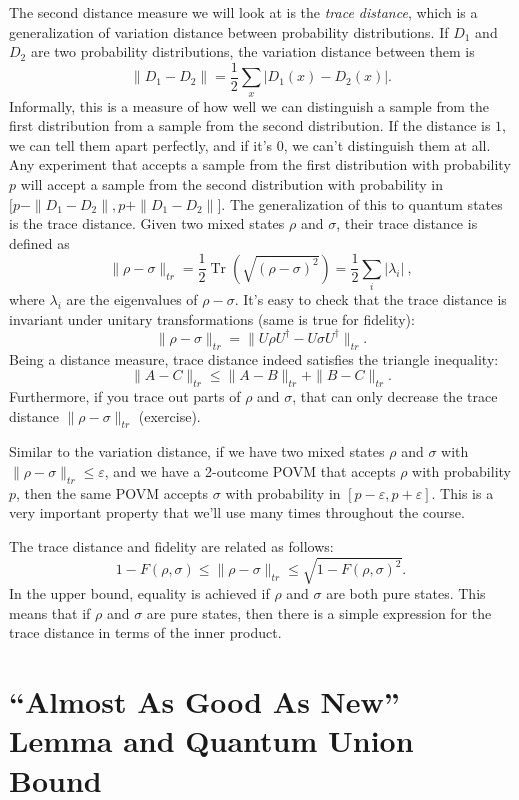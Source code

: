 \documentclass[12pt]{report}
\theoremstyle{plain}
\theoremstyle{definition}
\newcommand{\eps}{\varepsilon}
\newcommand{\Tr}{\operatorname{Tr}}
\begin{document}
The second distance measure we will look at is the \emph{trace distance}, which is a generalization of variation distance between probability distributions. If $D_1$ and $D_2$ are two probability distributions, the variation distance between them is
\[
\| D_1 - D_2 \| = \frac{1}{2} \sum_x |D_1(x) - D_2(x)|.
\]
Informally, this is a measure of how well we can distinguish a sample from the first distribution from a sample from the second distribution. If the distance is $1$, we can tell them apart perfectly, and if it's $0$, we can't distinguish them at all. Any experiment that accepts a sample from the first distribution with probability $p$ will accept a sample from the second distribution with probability in $\big[p - \|D_1 - D_2\|, p + \|D_1 - D_2\|\big]$. The generalization of this to quantum states is the trace distance. Given two mixed states $\rho$ and $\sigma$, their trace distance is defined as
\[
\| \rho - \sigma \|_{tr} = \frac12 \Tr\left( \sqrt{(\rho - \sigma)^2} \right) = \frac12 \sum_{i} |\lambda_i| \ ,
\]
where $\lambda_i$ are the eigenvalues of $\rho - \sigma$. It's easy to check that the trace distance is invariant under unitary transformations (same is true for fidelity):
\[
\| \rho - \sigma \|_{tr} = \| U \rho U^\dagger - U \sigma U^\dagger \|_{tr}.
\]
Being a distance measure, trace distance indeed satisfies the triangle inequality:
\[
\| A - C\|_{tr} \leq \|A - B\|_{tr} + \|B - C\|_{tr}.
\]
Furthermore, if you trace out parts of $\rho$ and $\sigma$, that can only decrease the trace distance $\| \rho - \sigma \|_{tr}$ (exercise).

Similar to the variation distance, if we have two mixed states $\rho$ and $\sigma$ with $\| \rho - \sigma \|_{tr} \leq \eps$, and we have a 2-outcome POVM that accepts $\rho$ with probability $p$, then the same POVM accepts $\sigma$ with probability in $[p-\eps, p+\eps]$. This is a very important property that we'll use many times throughout the course.

The trace distance and fidelity are related as follows:
\[
1 - F(\rho, \sigma) \leq \| \rho - \sigma \|_{tr} \leq \sqrt{1 - F(\rho, \sigma)^2}.
\]
In the upper bound, equality is achieved if $\rho$ and $\sigma$ are both pure states. This means that if $\rho$ and $\sigma$ are pure states, then there is a simple expression for the trace distance in terms of the inner product.


\section{``Almost As Good As New'' Lemma and Quantum Union Bound }
\end{document}
